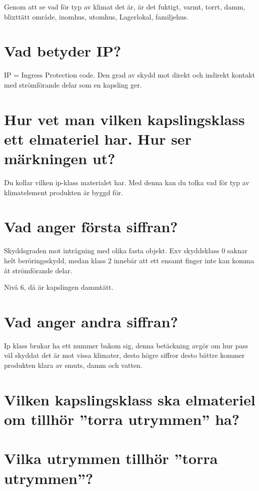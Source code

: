 \documentclass[a4paper,swedish]{article}
\begin{document}
Genom att se vad för typ av klimat det är, är det fuktigt, varmt, torrt, damm, blixttätt område, inomhus, utomhus, Lagerlokal, familjehus.

\section{Vad betyder IP?}

IP = Ingress Protection code.
Den grad av skydd mot direkt och indirekt kontakt med strömförande delar som en kapsling ger.

\section{Hur vet man vilken kapslingsklass ett elmateriel har. Hur ser märkningen ut?}
\label{sec:q_m_4}

Du kollar vilken ip-klass materialet har. Med denna kan du tolka vad för typ av klimatelement produkten är byggd för.

\section{Vad anger första siffran?}

Skyddsgraden mot inträgning med olika fasta objekt. Exv skyddsklass 0 saknar helt beröringsskydd,
medan klass 2 innebär att ett ensamt finger inte kan komma åt strömförande delar.

Nivå 6, då är kapslingen dammtätt.

\section{Vad anger andra siffran?}
\label{sec:q_m_6}

Ip klass brukar ha ett nummer bakom sig, denna betäckning avgör om hur pass väl skyddat det är mot vissa klimater, desto högre siffror desto bättre kommer produkten klara av smuts, damm och vatten.

\section{Vilken kapslingsklass ska elmateriel om tillhör ”torra utrymmen” ha?}


\section{Vilka utrymmen tillhör ”torra utrymmen”?}
\label{sec:q_m_8}
\end{document}
